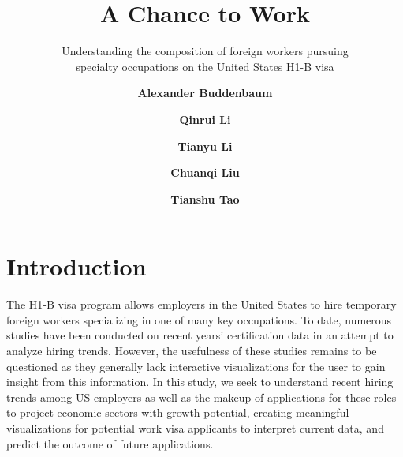 \documentclass[sigconf]{acmart}
\begin{document}
\title{A Chance to Work}
\subtitle{Understanding the composition of foreign workers 
pursuing \\specialty occupations on the United States H1-B visa
}


\author{\textbf{Alexander Buddenbaum}}

\author{\textbf{Qinrui Li}}

\author{\textbf{Tianyu Li}}


\author{\textbf{Chuanqi Liu}}

\author{\textbf{Tianshu Tao}}



\maketitle
\pagestyle{plain}
\section{Introduction}


The H1-B visa program allows employers in the United States to hire temporary foreign workers specializing in one of many key occupations.  
To date, numerous studies have been conducted on recent years’ certification data in an attempt to analyze hiring trends. 
However, the usefulness of these studies remains to be questioned as they generally lack interactive visualizations for the user to gain 
insight from this information. In this study, we seek to understand recent hiring trends among US employers as well as the makeup of 
applications for these roles to project economic sectors with growth potential, creating meaningful visualizations for potential work 
visa applicants to interpret current data, and predict the outcome of future applications.
\end{document}
